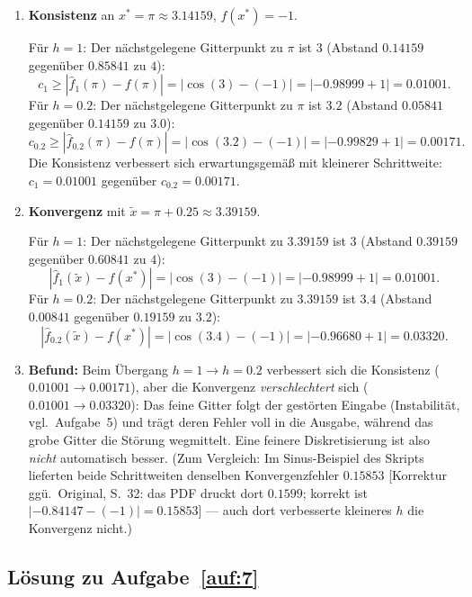 \documentclass[a4paper,11pt]{scrartcl}
\begin{document}
\begin{enumerate}[label=(\alph*)]
  \item \textbf{Konsistenz} an $x^* = \pi \approx 3.14159$, $f(x^*) = -1$.

  Für $h = 1$: Der nächstgelegene Gitterpunkt zu $\pi$ ist $3$ (Abstand $0.14159$ gegenüber $0.85841$ zu $4$):
  \[ c_1 \geq \left| \hat{f}_1(\pi) - f(\pi) \right| = \left| \cos(3) - (-1) \right| = |-0.98999 + 1| = 0.01001. \]
  Für $h = 0.2$: Der nächstgelegene Gitterpunkt zu $\pi$ ist $3.2$ (Abstand $0.05841$ gegenüber $0.14159$ zu $3.0$):
  \[ c_{0.2} \geq \left| \hat{f}_{0.2}(\pi) - f(\pi) \right| = \left| \cos(3.2) - (-1) \right| = |-0.99829 + 1| = 0.00171. \]
  Die Konsistenz verbessert sich erwartungsgemäß mit kleinerer Schrittweite: $c_1 = 0.01001$ gegenüber $c_{0.2} = 0.00171$.

  \item \textbf{Konvergenz} mit $\tilde{x} = \pi + 0.25 \approx 3.39159$.

  Für $h = 1$: Der nächstgelegene Gitterpunkt zu $3.39159$ ist $3$ (Abstand $0.39159$ gegenüber $0.60841$ zu $4$):
  \[ \left| \hat{f}_1(\tilde{x}) - f(x^*) \right| = \left| \cos(3) - (-1) \right| = |-0.98999 + 1| = 0.01001. \]
  Für $h = 0.2$: Der nächstgelegene Gitterpunkt zu $3.39159$ ist $3.4$ (Abstand $0.00841$ gegenüber $0.19159$ zu $3.2$):
  \[ \left| \hat{f}_{0.2}(\tilde{x}) - f(x^*) \right| = \left| \cos(3.4) - (-1) \right| = |-0.96680 + 1| = 0.03320. \]

  \item \textbf{Befund:} Beim Übergang $h = 1 \to h = 0.2$ verbessert sich die Konsistenz ($0.01001 \to 0.00171$), aber die Konvergenz \emph{verschlechtert} sich ($0.01001 \to 0.03320$): Das feine Gitter folgt der gestörten Eingabe (Instabilität, vgl.\ Aufgabe~5) und trägt deren Fehler voll in die Ausgabe, während das grobe Gitter die Störung wegmittelt. Eine feinere Diskretisierung ist also \emph{nicht} automatisch besser. (Zum Vergleich: Im Sinus-Beispiel des Skripts lieferten beide Schrittweiten denselben Konvergenzfehler $0.15853$ [Korrektur ggü.\ Original, S.~32: das PDF druckt dort \glqq$0.1599$\grqq; korrekt ist $|-0.84147 - (-1)| = 0.15853$] --- auch dort verbesserte kleineres $h$ die Konvergenz nicht.)
\end{enumerate}

\subsection*{Lösung zu Aufgabe~\ref{auf:7}}
\end{document}
